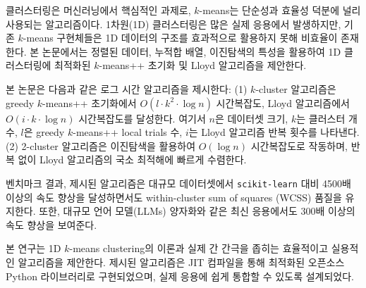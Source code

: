 \KoreanAbstractHeader

클러스터링은 머신러닝에서 핵심적인 과제로, $k$-means는 단순성과 효율성 덕분에 널리 사용되는 알고리즘이다. 1차원(1D) 클러스터링은 많은 실제 응용에서 발생하지만, 기존 $k$-means 구현체들은 1D 데이터의 구조를 효과적으로 활용하지 못해 비효율이 존재한다. 본 논문에서는 정렬된 데이터, 누적합 배열, 이진탐색의 특성을 활용하여 1D 클러스터링에 최적화된 $k$-means++ 초기화 및 Lloyd 알고리즘을 제안한다.

본 논문은 다음과 같은 로그 시간 알고리즘을 제시한다: (1) \(k\)-cluster 알고리즘은 greedy $k$-means++ 초기화에서 \(O(l \cdot k^2 \cdot \log n)\) 시간복잡도, Lloyd 알고리즘에서 \(O(i \cdot k \cdot \log n)\) 시간복잡도를 달성한다. 여기서 \(n\)은 데이터셋 크기, \(k\)는 클러스터 개수, \(l\)은 greedy $k$-means++ local trials 수, \(i\)는 Lloyd 알고리즘 반복 횟수를 나타낸다. (2) 2-cluster 알고리즘은 이진탐색을 활용하여 \(O(\log n)\) 시간복잡도로 작동하며, 반복 없이 Lloyd 알고리즘의 국소 최적해에 빠르게 수렴한다.

벤치마크 결과, 제시된 알고리즘은 대규모 데이터셋에서 \texttt{scikit-learn} 대비 4500배 이상의 속도 향상을 달성하면서도 within-cluster sum of squares (WCSS) 품질을 유지한다. 또한, 대규모 언어 모델(LLMs) 양자화와 같은 최신 응용에서도 300배 이상의 속도 향상을 보여준다.

본 연구는 1D $k$-means clustering의 이론과 실제 간 간극을 좁히는 효율적이고 실용적인 알고리즘을 제안한다. 제시된 알고리즘은 JIT 컴파일을 통해 최적화된 오픈소스 Python 라이브러리로 구현되었으며, 실제 응용에 쉽게 통합할 수 있도록 설계되었다.

